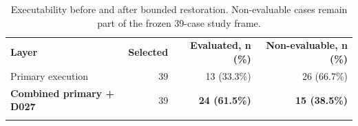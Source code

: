 \begin{table}[t]
\centering
\caption{Executability before and after bounded restoration. Non-evaluable cases remain part of the frozen 39-case study frame.}
\label{tab:study-summary}
\vspace{0.35em}
\small
\renewcommand{\arraystretch}{1.28}
\setlength{\tabcolsep}{10pt}
\begin{tabular}{lrrr}
\toprule
\addlinespace[2pt]
\textbf{Layer} & \textbf{Selected} & \textbf{Evaluated, n (\%)} & \textbf{Non-evaluable, n (\%)} \\
\addlinespace[2pt]
\midrule
\addlinespace[3pt]
Primary execution & 39 & 13 (33.3\%) & 26 (66.7\%) \\
\addlinespace[3pt]
\textbf{Combined primary + D027} & 39 & \textbf{24 (61.5\%)} & \textbf{15 (38.5\%)} \\
\addlinespace[3pt]
\bottomrule
\end{tabular}
\vspace{0.25em}
\end{table}
